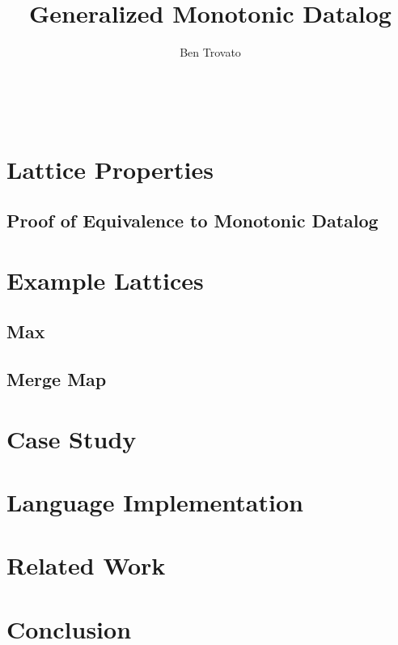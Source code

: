 \documentclass{vldb}
\begin{document}
\title{Generalized Monotonic Datalog}


\author{
\alignauthor
Ben Trovato\\
       \\
       \\
       \\
}

\maketitle

\begin{abstract}
\end{abstract}



\section{Lattice Properties}

\subsection{Proof of Equivalence to Monotonic Datalog}

\section{Example Lattices}

\subsection{Max}

\subsection{Merge Map}

\section{Case Study}

\section{Language Implementation}

\section{Related Work}

\section{Conclusion}



\end{document}
